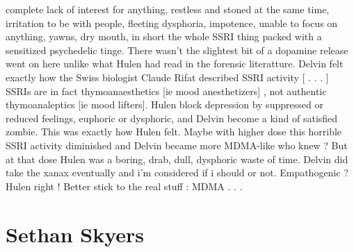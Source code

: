 \documentclass[12pt]{book}
\begin{document}
complete lack of interest for anything, restless and stoned at the same time, irritation to be with people, fleeting dysphoria, impotence, unable to focus on anything, yawns, dry mouth, in short the whole SSRI thing packed with a sensitized psychedelic tinge. There wasn't the slightest bit of a dopamine release went on here unlike what Hulen had read in the forensic literatture. Delvin felt exactly how the Swiss biologist Claude Rifat described SSRI activity  [ . . . ] SSRIs are in fact thymoanaesthetics [ie mood anesthetizers] , not authentic thymoanaleptics [ie mood lifters]. Hulen block depression by suppressed or reduced feelings, euphoric or dysphoric, and Delvin become a kind of satisfied zombie. This was exactly how Hulen felt. Maybe with higher dose this horrible SSRI activity diminished and Delvin became more MDMA-like who knew ? But at that dose Hulen was a boring, drab, dull, dysphoric waste of time. Delvin did take the xanax eventually and i'm considered if i should or not. Empathogenic ? Hulen right ! Better stick to the real stuff : MDMA . . . 



\chapter{Sethan Skyers}
\end{document}
